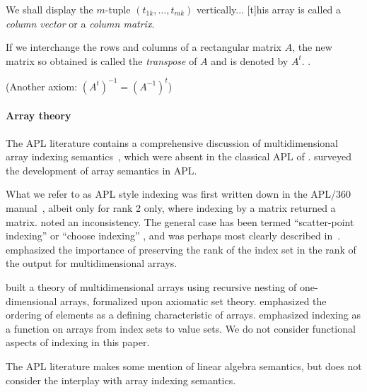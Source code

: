 We shall display the $m$-tuple $(t_{1k}, \dots, t_{mk})$ vertically... [t]his array is called a \textit{column vector} or a \textit{column matrix}.

If we interchange the rows and columns of a rectangular matrix $A$, the new matrix so obtained is called the \textit{transpose} of $A$ and is denoted by $A^t$. \cite[p. 615, Exercise 7]{Apostol1967}.

(Another axiom: ${(A^t)}^{-1} = {(A^{-1})}^t$)

\paragraph{Array theory} The APL literature contains a comprehensive discussion
of multidimensional array indexing semantics~\cite{Brown1982}, which were
absent in the classical APL of \cite{Iverson1962}. \cite{Ruehr1982,Gerth1988}
surveyed the development of array semantics in APL.

What we refer to as APL style indexing was first written down in the APL/360
manual~\cite{Falkoff1968}, albeit only for rank 2 only, where indexing by a
matrix returned a matrix. \cite{Haegi1976} noted an inconsistency. The general
case has been termed ``scatter-point indexing'' or ``choose indexing''
\cite{Brown1972,Ruehr1982}, and was perhaps most clearly described
in~\cite{More1979}. \cite{Gull1979} emphasized the importance of preserving
the rank of the index set in the rank of the output for multidimensional
arrays.

\cite{More1973} built a theory of multidimensional arrays using recursive
nesting of one-dimensional arrays, formalized upon axiomatic set theory.
\cite{Ghandour1973} emphasized the ordering of elements as a defining
characteristic of arrays. \cite{Gerth1988} emphasized indexing as a function on
arrays from index sets to value sets. We do not consider functional aspects of
indexing in this paper.

The APL literature makes some mention of linear algebra semantics, but does not
consider the interplay with array indexing semantics.

